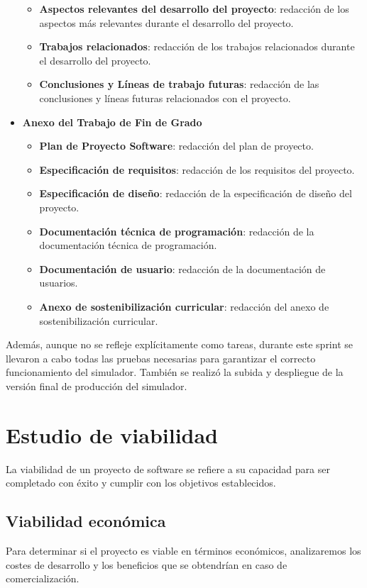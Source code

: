 \begin{itemize}
\begin{itemize}
        \item \textbf{Aspectos relevantes del desarrollo del proyecto}: redacción de los aspectos más relevantes durante el desarrollo del proyecto.
        \item \textbf{Trabajos relacionados}: redacción de los trabajos relacionados durante el desarrollo del proyecto.
        \item \textbf{Conclusiones y Líneas de trabajo futuras}: redacción de las conclusiones y líneas futuras relacionados con el proyecto.
    \end{itemize}
    \item \textbf{Anexo del Trabajo de Fin de Grado}
    \begin{itemize}
        \item \textbf{Plan de Proyecto Software}: redacción del plan de proyecto.
        \item \textbf{Especificación de requisitos}: redacción de los requisitos del proyecto.
        \item \textbf{Especificación de diseño}: redacción de la especificación de diseño del proyecto.
        \item \textbf{Documentación técnica de programación}: redacción de la documentación técnica de programación.
        \item \textbf{Documentación de usuario}: redacción de la documentación de usuarios.
        \item \textbf{Anexo de sostenibilización curricular}: redacción del anexo de sostenibilización curricular.
    \end{itemize}
\end{itemize}

Además, aunque no se refleje explícitamente como tareas, durante este sprint se llevaron a cabo todas las pruebas necesarias para garantizar el correcto funcionamiento del simulador. También se realizó la subida y despliegue de la versión final de producción del simulador.


\section{Estudio de viabilidad}
\label{sec:Viabilidad}
La viabilidad de un proyecto de software se refiere a su capacidad para ser completado con éxito y cumplir con los objetivos establecidos.

\subsection{Viabilidad económica}
\label{subsec:Economico}
Para determinar si el proyecto es viable en términos económicos, analizaremos los costes de desarrollo y los beneficios que se obtendrían en caso de comercialización.

